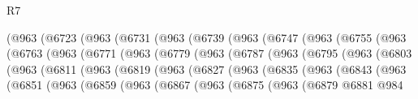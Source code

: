 \begin{lexlean}{R7}
\begin{coremodule}
          (@963
            (@6723
              (@963
                (@6731
                  (@963
                    (@6739
                      (@963
                        (@6747
                          (@963
                            (@6755
                              (@963
                                (@6763
                                  (@963
                                    (@6771
                                      (@963
                                        (@6779
                                          (@963
                                            (@6787
                                              (@963
                                                (@6795
                                                  (@963
                                                    (@6803
                                                      (@963
                                                        (@6811
                                                          (@963
                                                            (@6819
                                                              (@963
                                                                (@6827
                                                                  (@963
                                                                    (@6835
                                                                      (@963
                                                                        (@6843
                                                                          (@963
                                                                            (@6851
                                                                              (@963
                                                                                (@6859
                                                                                  (@963
                                                                                    (@6867
                                                                                      (@963
                                                                                        (@6875
                                                                                          (@963
                                                                                            (@6879
                                                                                              @6881
                                                                                              @984

\end{coremodule}
\end{lexlean}

